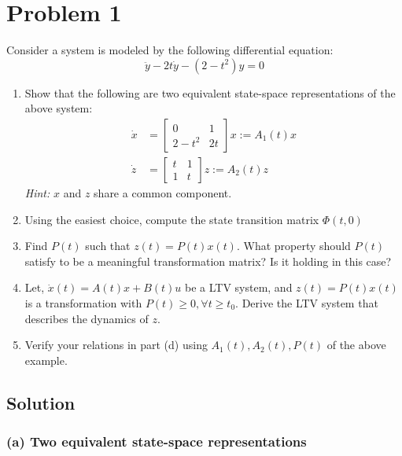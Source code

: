 \section*{Problem 1}

Consider a system is modeled by the following differential equation:
\[
    \ddot y - 2t\dot y - (2 - t^2)y = 0
\]
\begin{enumerate}[label= (\alph*)]
    \item Show that the following are two equivalent state-space representations of the above system:
          \begin{align*}
              \dot x
               & =
              \begin{bmatrix}
                  0       & 1  \\
                  2 - t^2 & 2t
              \end{bmatrix}
              x
              :=
              A_1(t) x
              \\
              \dot z
               & =
              \begin{bmatrix}
                  t & 1 \\
                  1 & t
              \end{bmatrix}
              z
              :=
              A_2(t) z
          \end{align*}
          \textit{Hint:} \(x\) and \(z\) share a common component.
    \item Using the easiest choice, compute the state transition matrix \(\Phi(t, 0)\)
    \item Find \(P(t)\) such that \( z(t) = P(t)x(t) \).
          What property should \(P(t)\) satisfy to be a meaningful transformation matrix?
          Is it holding in this case?
    \item Let, \( \dot{x}(t)=A(t) x+B(t) u \) be a LTV system, and \( z(t)=P(t) x(t) \) is a transformation with \( P(t) \geq 0, \forall t \geq t_{0} \).
          Derive the LTV system that describes the dynamics of \( z \).
    \item Verify your relations in part (d) using \( A_{1}(t), A_{2}(t), P(t) \) of the above example.
\end{enumerate}

\subsection*{Solution}

\subsubsection*{(a) Two equivalent state-space representations}

